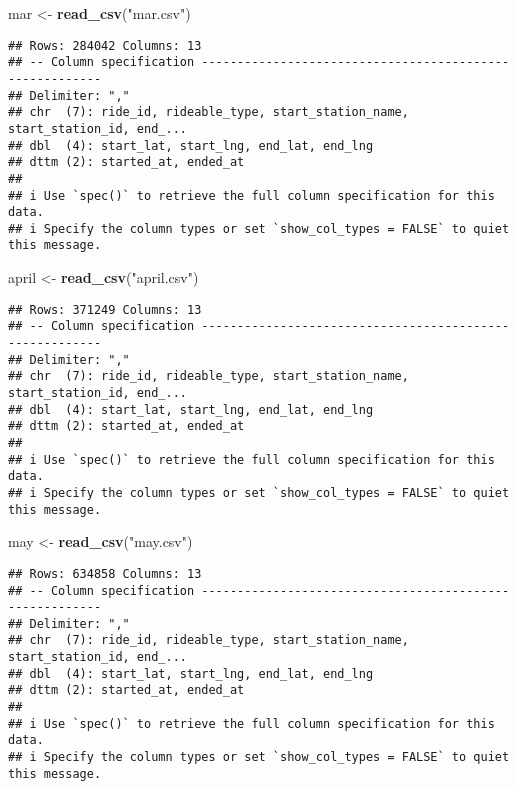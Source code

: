 \documentclass[
]{article}
\newenvironment{Shaded}{\begin{snugshade}}{\end{snugshade}}
\newcommand{\FunctionTok}[1]{\textcolor[rgb]{0.13,0.29,0.53}{\textbf{#1}}}
\newcommand{\NormalTok}[1]{#1}
\newcommand{\OtherTok}[1]{\textcolor[rgb]{0.56,0.35,0.01}{#1}}
\newcommand{\StringTok}[1]{\textcolor[rgb]{0.31,0.60,0.02}{#1}}
\begin{document}
\begin{Shaded}
\begin{Highlighting}[]
\NormalTok{mar }\OtherTok{\textless{}{-}} \FunctionTok{read\_csv}\NormalTok{(}\StringTok{"mar.csv"}\NormalTok{)}
\end{Highlighting}
\end{Shaded}

\begin{verbatim}
## Rows: 284042 Columns: 13
## -- Column specification --------------------------------------------------------
## Delimiter: ","
## chr  (7): ride_id, rideable_type, start_station_name, start_station_id, end_...
## dbl  (4): start_lat, start_lng, end_lat, end_lng
## dttm (2): started_at, ended_at
## 
## i Use `spec()` to retrieve the full column specification for this data.
## i Specify the column types or set `show_col_types = FALSE` to quiet this message.
\end{verbatim}

\begin{Shaded}
\begin{Highlighting}[]
\NormalTok{april }\OtherTok{\textless{}{-}} \FunctionTok{read\_csv}\NormalTok{(}\StringTok{"april.csv"}\NormalTok{)}
\end{Highlighting}
\end{Shaded}

\begin{verbatim}
## Rows: 371249 Columns: 13
## -- Column specification --------------------------------------------------------
## Delimiter: ","
## chr  (7): ride_id, rideable_type, start_station_name, start_station_id, end_...
## dbl  (4): start_lat, start_lng, end_lat, end_lng
## dttm (2): started_at, ended_at
## 
## i Use `spec()` to retrieve the full column specification for this data.
## i Specify the column types or set `show_col_types = FALSE` to quiet this message.
\end{verbatim}

\begin{Shaded}
\begin{Highlighting}[]
\NormalTok{may }\OtherTok{\textless{}{-}} \FunctionTok{read\_csv}\NormalTok{(}\StringTok{"may.csv"}\NormalTok{)}
\end{Highlighting}
\end{Shaded}

\begin{verbatim}
## Rows: 634858 Columns: 13
## -- Column specification --------------------------------------------------------
## Delimiter: ","
## chr  (7): ride_id, rideable_type, start_station_name, start_station_id, end_...
## dbl  (4): start_lat, start_lng, end_lat, end_lng
## dttm (2): started_at, ended_at
## 
## i Use `spec()` to retrieve the full column specification for this data.
## i Specify the column types or set `show_col_types = FALSE` to quiet this message.
\end{verbatim}
\end{document}
